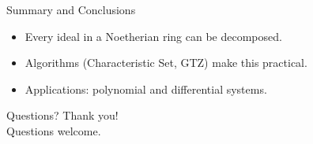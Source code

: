 \documentclass[11pt]{beamer}
\begin{document}
\begin{frame}{Summary and Conclusions}
\begin{itemize}
  \item Every ideal in a Noetherian ring can be decomposed.
  \item Algorithms (Characteristic Set, GTZ) make this practical.
  \item Applications: polynomial and differential systems.
\end{itemize}
\end{frame}

\begin{frame}{Questions?}
  \centering
  \Huge Thank you! \\
  \vspace{1cm}
  \Large Questions welcome.
\end{frame}
\end{document}
